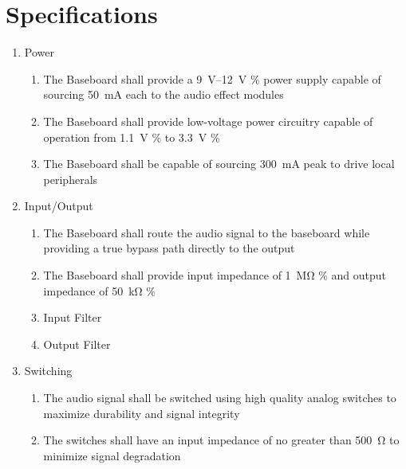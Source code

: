 \documentclass[12pt, titlepage]{/home/air/projects/latex-template/tex-template}
\begin{document}
\section{Specifications}
\begin{enumerate}
    \item Power
          \begin{enumerate}
              \item The Baseboard shall provide a \qtyrange[range-units = single, range-phrase = --]{9}{12}{\volt} \% power supply capable of sourcing \pm \SI{50}{\milli\ampere} each to the audio effect modules
              \item The Baseboard shall provide low-voltage power circuitry capable of operation from \SI{1.1}{\volt} \% to \SI{3.3}{\volt} \%
              \item The Baseboard shall be capable of sourcing \SI{300}{\milli\ampere} peak to drive local peripherals
          \end{enumerate}
          \item{Input/Output}
          \begin{enumerate}
              \item The Baseboard shall route the audio signal to the baseboard while providing a true bypass path directly to the output
              \item The Baseboard shall provide input impedance of \SI{1}{\mega\ohm} \% and output impedance of \SI{50}{\kilo\ohm} \%
              \item Input Filter
              \item Output Filter
          \end{enumerate}
          \item{Switching}
          \begin{enumerate}
              \item The audio signal shall be switched using high quality analog switches to maximize durability and signal integrity
              \item The switches shall have an input impedance of no greater than \SI{500}{\ohm} to minimize signal degradation
          \end{enumerate}
\end{enumerate}
\end{document}
